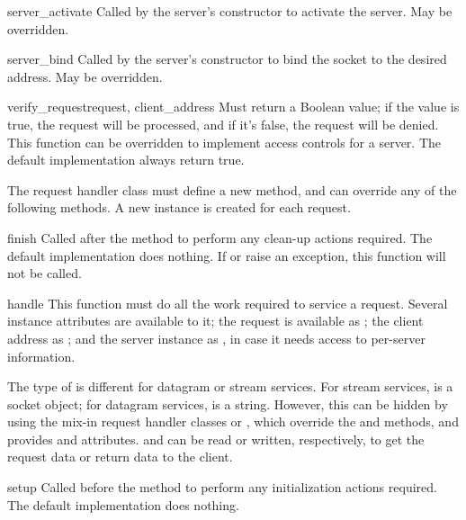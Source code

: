 
\begin{funcdesc}{server_activate}{}
Called by the server's constructor to activate the server.
May be overridden.
\end{funcdesc}

\begin{funcdesc}{server_bind}{}
Called by the server's constructor to bind the socket to the desired
address.  May be overridden.
\end{funcdesc}

\begin{funcdesc}{verify_request}{request, client_address}
Must return a Boolean value; if the value is true, the request will be
processed, and if it's false, the request will be denied.
This function can be overridden to implement access controls for a server.
The default implementation always return true.
\end{funcdesc}

The request handler class must define a new  method,
and can override any of the following methods.  A new instance is
created for each request.

\begin{funcdesc}{finish}{}
Called after the  method to perform any clean-up
actions required.  The default implementation does nothing.  If
 or  raise an exception, this
function will not be called.
\end{funcdesc}

\begin{funcdesc}{handle}{}
This function must do all the work required to service a request.
Several instance attributes are available to it; the request is
available as ; the client address as
; and the server instance as
, in case it needs access to per-server
information.

The type of  is different for datagram or stream
services.  For stream services,  is a socket
object; for datagram services,  is a string.
However, this can be hidden by using the mix-in request handler
classes
 or , which
override the  and  methods, and
provides  and  attributes.
 and  can be read or written,
respectively, to get the request data or return data to the client.
\end{funcdesc}

\begin{funcdesc}{setup}{}
Called before the  method to perform any
initialization actions required.  The default implementation does
nothing.
\end{funcdesc}
